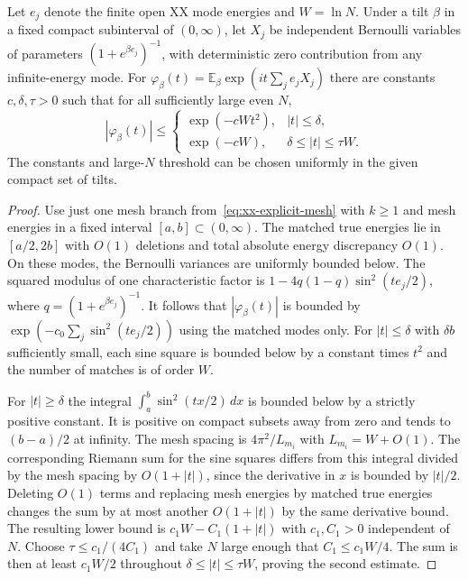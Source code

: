 \begin{corollary}
\label{cor:xx-fourier}
Let $e_j$ denote the finite open XX mode energies and $W=\ln N$. Under a tilt
$\beta$ in a fixed compact subinterval of $(0,\infty)$, let $X_j$
be independent Bernoulli variables of parameters
$(1+e^{\beta e_j})^{-1}$, with deterministic zero contribution from
any infinite-energy mode. For $\varphi_\beta(t)
=\mathbb E_\beta\exp(it\sum_j e_j X_j)$ there are constants
$c,\delta,\tau>0$ such that for all sufficiently large even $N$,
\[
|\varphi_\beta(t)|\le
\begin{cases}
\exp(-cWt^2), & |t|\le\delta,\\
\exp(-cW), & \delta\le |t|\le \tau W.
\end{cases}
\]
The constants and large-$N$ threshold can be chosen uniformly in
the given compact set of tilts.
\end{corollary}

\begin{proof}
Use just one mesh branch from~\eqref{eq:xx-explicit-mesh} with $k\ge1$ and mesh energies
in a fixed interval $[a,b]\subset(0,\infty)$. The matched true
energies lie in $[a/2,2b]$ with $O(1)$ deletions and total
absolute energy discrepancy $O(1)$. On these modes, the Bernoulli
variances are uniformly bounded below. The squared modulus of
one characteristic factor is
$1-4q(1-q)\sin^2(te_j/2)$, where $q=(1+e^{\beta e_j})^{-1}$.
It follows that $|\varphi_\beta(t)|$ is bounded by
$\exp(-c_0\sum_j\sin^2(te_j/2))$ using the matched modes only.
For $|t|\le\delta$ with $\delta b$ sufficiently small, each
sine square is bounded below by a constant times $t^2$ and the
number of matches is of order $W$.

For $|t|\ge\delta$ the integral
$\int_a^b\sin^2(tx/2)\,dx$ is bounded below by a strictly positive
constant. It is positive on compact subsets away from zero and
tends to $(b-a)/2$ at infinity. The mesh spacing is
$4\pi^2/L_{m_i}$ with $L_{m_i}=W+O(1)$. The corresponding
Riemann sum for the sine squares differs from this integral
divided by the mesh spacing by $O(1+|t|)$, since the derivative
in $x$ is bounded by $|t|/2$. Deleting $O(1)$ terms and replacing
mesh energies by matched true energies changes the sum by at
most another $O(1+|t|)$ by the same derivative bound. The resulting
lower bound is $c_1W-C_1(1+|t|)$ with $c_1,C_1>0$ independent of $N$.
Choose $\tau\le c_1/(4C_1)$ and take $N$ large enough that
$C_1\le c_1W/4$. The sum is then at least $c_1W/2$ throughout
$\delta\le |t|\le\tau W$, proving the second estimate.
\end{proof}

